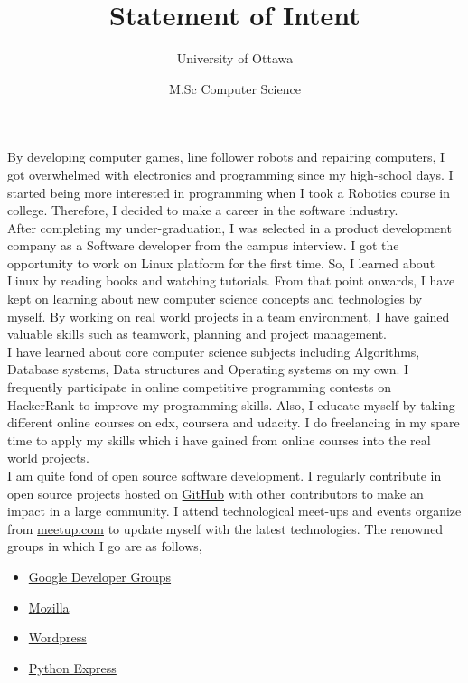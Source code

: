\documentclass{article}
\title{Statement of Intent}
\author{University of Ottawa}\date{M.Sc Computer Science}
\begin{document}
  \maketitle %

By developing computer games, line follower robots and repairing computers, I got overwhelmed with electronics and programming since my high-school days. I started being more interested in programming when I took a Robotics course in college. Therefore, I decided to make a career in the software industry.\\

After completing my under-graduation, I was selected in a product development company as a Software developer from the campus interview. I got the opportunity to work on Linux platform for the first time. So, I learned about Linux by reading books and watching tutorials. From that point onwards, I have kept on learning about new computer science concepts and technologies by myself. By working on real world projects in a team environment, I have gained valuable skills such as teamwork, planning and project management.\\

I have learned about core computer science subjects including Algorithms, Database systems, Data structures and Operating systems on my own. I frequently participate in online competitive programming contests on HackerRank to improve my programming skills. Also, I educate myself by taking different online courses on edx, coursera and udacity. I do freelancing in my spare time to apply my skills which i have gained from online courses into the real world projects.\\

I am quite fond of open source software development. I regularly contribute in open source projects hosted on \href{http://www.GitHub.com/mehul-m-prajapati}{GitHub} with other contributors to make an impact in a large community. I attend technological meet-ups and events organize from \href{www.meetup.com}{meetup.com} to update myself with the latest technologies. The renowned groups in which I go are as follows,

\begin{itemize}
   \item \href{https://developers.google.com/groups/chapter/106261089114347152720/}{Google Developer Groups}
   
   \item \href{http://mozillaindia.org/}{Mozilla} 
   
   \item \href{https://www.meetup.com/ahmedabad-wp-meetup/members/72560962/}{Wordpress}
   
   \item \href{https://pythonexpress.in/}{Python Express}
\end{itemize}
\end{document}
